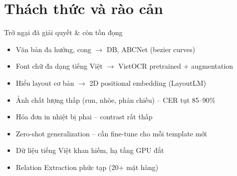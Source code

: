 \documentclass[aspectratio=169, 10pt]{beamer}
\begin{document}
\section{Thách thức và rào cản}

\begin{frame}{Trở ngại đã giải quyết \& còn tồn đọng}
 \begin{successbox}
 \begin{itemize}
 \item Văn bản đa hướng, cong $\rightarrow$ DB, ABCNet (bezier curves)
 \item Font chữ đa dạng tiếng Việt $\rightarrow$ VietOCR pretrained + augmentation
 \item Hiểu layout cơ bản $\rightarrow$ 2D positional embedding (LayoutLM)
 \end{itemize}
 \end{successbox}
 \vspace{0.3cm}

 \begin{warnbox}
 \begin{itemize}
 \item[$\times$] Ảnh chất lượng thấp (run, nhòe, phản chiếu) -- CER tụt 85--90\%
 \item[$\times$] Hóa đơn in nhiệt bị phai -- contrast rất thấp
 \item[$\times$] Zero-shot generalization -- cần fine-tune cho mỗi template mới
 \item[$\times$] Dữ liệu tiếng Việt khan hiếm, hạ tầng GPU đắt
 \item[$\times$] Relation Extraction phức tạp (20+ mặt hàng)
 \end{itemize}
 \end{warnbox}
\end{frame}
\end{document}
